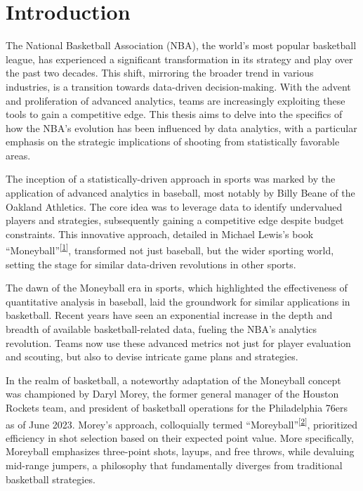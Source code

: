\documentclass[
  12pt,
  a4paper,
]{article}
\begin{document}
{
\hypersetup{linkcolor=}
\setcounter{tocdepth}{2}
\tableofcontents
}
\newpage

\hypertarget{introduction}{%
\section{Introduction}\label{introduction}}

The National Basketball Association (NBA), the world's most popular basketball league, has experienced a significant transformation in its strategy and play over the past two decades. This shift, mirroring the broader trend in various industries, is a transition towards data-driven decision-making. With the advent and proliferation of advanced analytics, teams are increasingly exploiting these tools to gain a competitive edge. This thesis aims to delve into the specifics of how the NBA's evolution has been influenced by data analytics, with a particular emphasis on the strategic implications of shooting from statistically favorable areas.

The inception of a statistically-driven approach in sports was marked by the application of advanced analytics in baseball, most notably by Billy Beane of the Oakland Athletics. The core idea was to leverage data to identify undervalued players and strategies, subsequently gaining a competitive edge despite budget constraints. This innovative approach, detailed in Michael Lewis's book ``Moneyball''\textsuperscript{{[}\protect\hyperlink{ref-Moneyball}{1}{]}}, transformed not just baseball, but the wider sporting world, setting the stage for similar data-driven revolutions in other sports.

The dawn of the Moneyball era in sports, which highlighted the effectiveness of quantitative analysis in baseball, laid the groundwork for similar applications in basketball. Recent years have seen an exponential increase in the depth and breadth of available basketball-related data, fueling the NBA's analytics revolution. Teams now use these advanced metrics not just for player evaluation and scouting, but also to devise intricate game plans and strategies.

In the realm of basketball, a noteworthy adaptation of the Moneyball concept was championed by Daryl Morey, the former general manager of the Houston Rockets team, and president of basketball operations for the Philadelphia 76ers as of June 2023. Morey's approach, colloquially termed ``Moreyball''\textsuperscript{{[}\protect\hyperlink{ref-Moreyball}{2}{]}}, prioritized efficiency in shot selection based on their expected point value. More specifically, Moreyball emphasizes three-point shots, layups, and free throws, while devaluing mid-range jumpers, a philosophy that fundamentally diverges from traditional basketball strategies.
\end{document}
